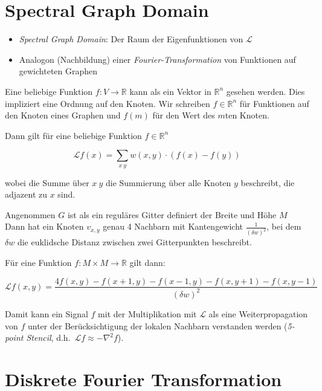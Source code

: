 \section{Spectral Graph Domain}

\begin{itemize}
  \item \emph{Spectral Graph Domain}: Der Raum der Eigenfunktionen von $\mathcal{L}$
  \item Analogon (Nachbildung) einer \emph{Fourier-Transformation} von Funktionen auf gewichteten Graphen
\end{itemize}

Eine beliebige Funktion $f: V \rightarrow \mathbb{R}$ kann als ein Vektor in $\mathbb{R}^n$ gesehen werden.
Dies impliziert eine Ordnung auf den Knoten.
Wir schreiben $f \in \mathbb{R}^n$ für Funktionen auf den Knoten eines Graphen und $f(m)$ für den Wert des $m$ten Knoten.

Dann gilt für eine beliebige Funktion $f \in \mathbb{R}^n$

\begin{equation}
  \mathcal{L}f(x) = \sum_{x~y} w(x, y) \cdot (f(x) - f(y))
\end{equation}

wobei die Summe über $x~y$ die Summierung über alle Knoten $y$ beschreibt, die adjazent zu $x$ sind.

Angenommen $G$ ist als ein reguläres Gitter definiert der Breite und Höhe $M$
Dann hat ein Knoten $v_{x,y}$ genau 4 Nachbarn mit Kantengewicht $\frac{1}{{(\delta w)}^2}$, bei dem $\delta w$ die euklidsche Distanz zwischen zwei Gitterpunkten beschreibt.

Für eine Funktion $f: M \times M \rightarrow \mathbb{R}$ gilt dann:

\begin{equation}
  \mathcal{L}f(x, y) = \frac{4f(x,y) - f(x+1, y) - f(x-1, y) - f(x, y+1) - f(x, y-1)}{{(\delta w)}^2}
\end{equation}

Damit kann ein Signal $f$ mit der Multiplikation mit $\mathcal{L}$ als eine Weiterpropagation von $f$ unter der Berücksichtigung der lokalen Nachbarn verstanden werden (\emph{5-point Stencil}, d.h.\ $\mathcal{L}f \approx - \nabla^2 f$).

\section{Diskrete Fourier Transformation}


